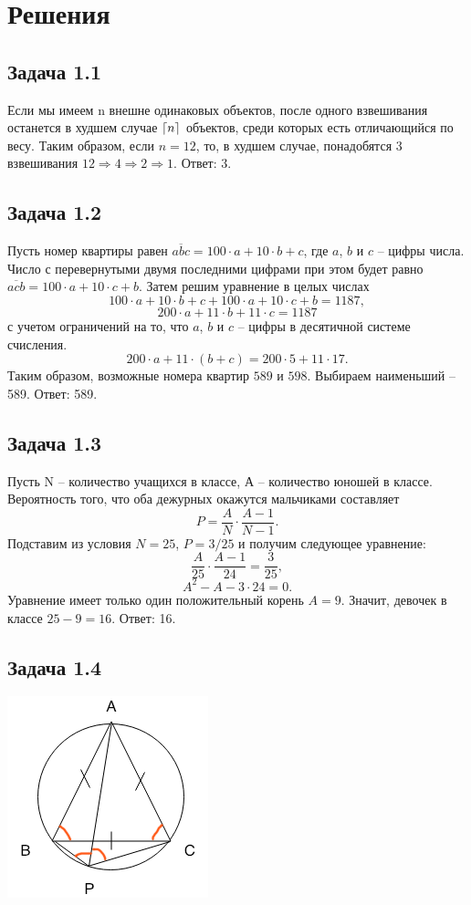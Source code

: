 \documentclass[12pt]{article}
\DeclarePairedDelimiter{\ceil}{\lceil}{\rceil}
\begin{document}
\section*{Решения}

\subsection*{Задача 1.1}
Если мы имеем n внешне одинаковых объектов, после одного взвешивания останется в худшем случае $\ceil{n}$ объектов, среди которых есть отличающийся по весу. Таким образом, если $n = 12$, то, в худшем случае, понадобятся 3 взвешивания $12\Rightarrow 4\Rightarrow 2\Rightarrow 1$.
Ответ: 3.

\subsection*{Задача 1.2}
Пусть номер квартиры равен $\overline{abc} = 100\cdot a + 10\cdot b + c$, где $a$, $b$ и $c$ -- цифры числа. Число с перевернутыми двумя последними цифрами при этом будет равно $\overline{acb} = 100\cdot a + 10\cdot c + b$. Затем решим уравнение в целых числах 
$$100 \cdot a + 10\cdot b + c + 100\cdot a + 10\cdot c + b = 1187,$$ 
$$200 \cdot a + 11\cdot b + 11\cdot c = 1187$$ с учетом ограничений на то, что $a$, $b$ и $c$ -- цифры в десятичной системе счисления.
$$200\cdot a + 11\cdot (b + c) = 200 \cdot 5 + 11 \cdot 17.$$
Таким образом, возможные номера квартир $589$ и $598$. Выбираем наименьший -- 589.
Ответ: 589.

\subsection*{Задача 1.3}
Пусть N -- количество учащихся в классе, А -- количество юношей в классе. Вероятность того, что оба дежурных окажутся мальчиками составляет 
$$P = \frac{A}{N}\cdot \frac{A - 1}{N - 1}.$$
Подставим из условия $N = 25$, $P = 3/25$ и получим следующее уравнение:
$$\frac{A}{25}\cdot\frac{A - 1}{24} = \frac{3}{25},$$
$$A^2 - A - 3 \cdot 24 = 0.$$
Уравнение имеет только один положительный корень $A = 9$. Значит, девочек в классе $25 - 9 = 16$. Ответ: 16.

\subsection*{Задача 1.4}
\includegraphics{math14_2}
\end{document}

